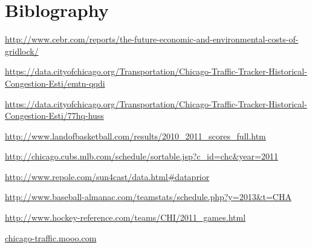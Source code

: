 \documentclass[12pt]{article}
\begin{document}
\section{Biblography}
\begin{thebibliography}{9}

  \url{http://www.cebr.com/reports/the-future-economic-and-environmental-costs-of-gridlock/}

  \url{https://data.cityofchicago.org/Transportation/Chicago-Traffic-Tracker-Historical-Congestion-Esti/emtn-qqdi}
  
  \url{https://data.cityofchicago.org/Transportation/Chicago-Traffic-Tracker-Historical-Congestion-Esti/77hq-huss}

  \url{http://www.landofbasketball.com/results/2010_2011_scores_full.htm}

  \url{http://chicago.cubs.mlb.com/schedule/sortable.jsp?c_id=chc&year=2011}

  \url{http://www.repole.com/sun4cast/data.html#dataprior}
	
  \url{http://www.baseball-almanac.com/teamstats/schedule.php?y=2013&t=CHA}

  \url{http://www.hockey-reference.com/teams/CHI/2011_games.html}
  
  \url{chicago-traffic.mooo.com}

\end{thebibliography}
\end{document}
